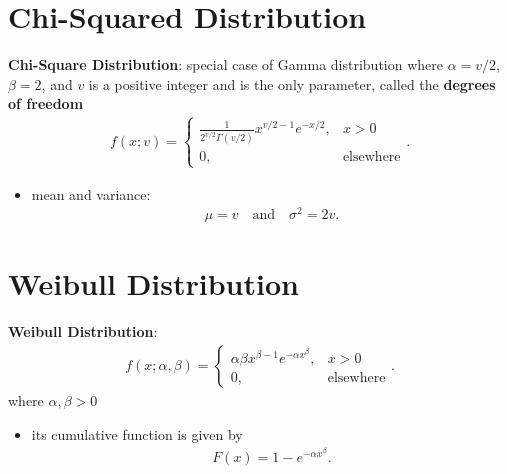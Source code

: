 \documentclass[10pt]{article}
\begin{document}
\section{Chi-Squared Distribution}
\begin{definition}
    \textbf{Chi-Square Distribution}: special case of Gamma distribution where $\alpha = v / 2$, $\beta = 2$, and $v$ is a positive integer and is the only parameter, called the \textbf{degrees of freedom}
    \begin{gather*}
        f(x;v) = \begin{cases}
            \frac{1}{2^{v / 2}\Gamma(v / 2)}x^{v / 2 - 1} e^{-x / 2}, & x>0 \\ 
            0, & \text{elsewhere}
        \end{cases}
    .\end{gather*}
    \begin{itemize}
        \item mean and variance: 
            \begin{gather*}
                \mu = v \quad \text{and} \quad \sigma^2 = 2v
            .\end{gather*}
    \end{itemize}
\end{definition}

\section{Weibull Distribution}
\begin{definition}
    \textbf{Weibull Distribution}:
    \begin{gather*}
        f(x;\alpha, \beta) = \begin{cases}
            \alpha\beta x^{\beta-1}e^{-\alpha x^\beta}, &x>0 \\ 
            0, & \text{elsewhere}
        \end{cases}
    .\end{gather*}
    where $\alpha, \beta >0$
     \begin{itemize}
        \item its cumulative function is given by 
            \begin{gather*}
                F(x) = 1-e^{-\alpha x^\beta}
            .\end{gather*}
    \end{itemize}
\end{definition}
\end{document}
